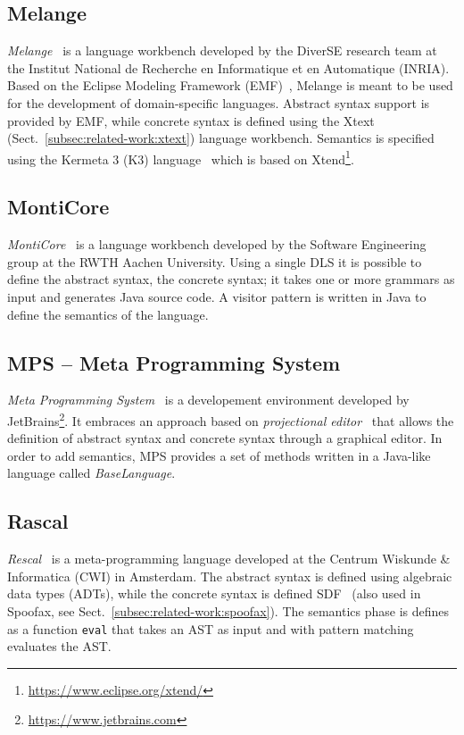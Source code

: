 \subsection{Melange}\label{subsec:related-work:melange}
\textit{Melange}~\cite{Degueule15}  is a language workbench developed by the DiverSE research team at the Institut National de Recherche en Informatique et en Automatique (INRIA). Based on the Eclipse Modeling Framework (EMF)~\cite{Steinberg08}, Melange is meant to be used for the development of domain-specific languages. Abstract syntax support is provided by EMF, while concrete syntax is defined using the Xtext (Sect.~\ref{subsec:related-work:xtext}) language workbench.
Semantics is specified using the Kermeta 3 (K3) language~\cite{Jezequel15} which is based on Xtend\footnote{\url{https://www.eclipse.org/xtend/}}.

\subsection{MontiCore}\label{subsec:related-work:monticore}
\textit{MontiCore}~\cite{Krahn10} is a language workbench developed by the Software Engineering group at the RWTH Aachen University. Using a single DLS it is possible to define the abstract syntax, the concrete syntax; it takes one or more grammars as input and generates Java source code.
A visitor pattern is written in Java to define the semantics of the language.

\subsection{MPS -- Meta Programming System}\label{subsec:related-work:mps}
\textit{Meta Programming System}~\cite{Volter11, Voelter12} is a developement environment developed by JetBrains\footnote{\url{https://www.jetbrains.com}}. It embraces an approach based on \textit{projectional editor}~\cite{Voelter14} that allows the definition of abstract syntax and concrete syntax through a graphical editor. In order to add semantics, MPS provides a set of methods written in a Java-like language called \textit{BaseLanguage}.

\subsection{Rascal}\label{subsec:related-work:rascal}

\textit{Rescal}~\cite{Klint09b} is a meta-programming language developed at the Centrum Wiskunde \& Informatica (CWI) in Amsterdam. The abstract syntax is defined using algebraic data types (ADTs), while the concrete syntax is defined SDF~\cite{Heering89c} (also used in Spoofax, see Sect.~\ref{subsec:related-work:spoofax}). The semantics phase is defines as a function \texttt{eval} that takes an AST as input and with pattern matching evaluates the AST.


